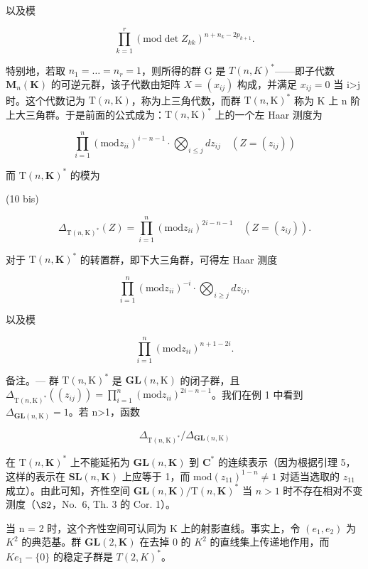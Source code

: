 以及模

\[
\prod_ {k = 1} ^ {r} (\mathrm{mod} \det Z _ {k k}) ^ {n + n _ {k} - 2 p _ {k + 1}}.
\]

特别地，若取 \(n_{1}=\ldots=n_{r}=1\)，则所得的群 G 是 \(T(n,K)^{*}\)——即子代数 \(\mathbf{M}_{n}(\mathbf{K})\) 的可逆元群，该子代数由矩阵 \(X=(x_{ij})\) 构成，并满足 \(x_{ij}=0\) 当 i\textgreater j 时。这个代数记为 \(\mathrm{T}(n,\mathrm{K})\)，称为上三角代数，而群 \(\mathrm{T}(n,\mathrm{K})^{*}\) 称为 K 上 n 阶上大三角群。于是前面的公式成为：\(\mathrm{T}(n,\mathrm{K})^{*}\) 上的一个左 Haar 测度为

\[
\prod_ {i = 1} ^ {n} (\mathrm{mod} z _ {i i}) ^ {i - n - 1} \cdot \bigotimes_ {i \leqslant j} d z _ {i j} \quad (Z = (z _ {i j}))\tag{9 bis}
\]

而 \(\mathrm{T}(n,\mathbf{K})^*\) 的模为

(10 bis)

\[
\Delta_ {\mathrm{T} (n, \mathrm{K}) ^ {*}} (Z) = \prod_ {i = 1} ^ {n} (\mathrm{mod} z _ {i i}) ^ {2 i - n - 1} \quad \left(Z = \left(z _ {i j}\right)\right).
\]

对于 \(\mathrm{T}(n,\mathbf{K})^*\) 的转置群，即下大三角群，可得左 Haar 测度

\[
\prod_ {i = 1} ^ {n} (\mathrm{mod} z _ {i i}) ^ {- i} \cdot \bigotimes_ {i \geqslant j} d z _ {i j},
\]

以及模

\[
\prod_ {i = 1} ^ {n} (\mathrm{mod} z _ {i i}) ^ {n + 1 - 2 i}.
\]

备注。--- 群 \(\mathrm{T}(n,\mathrm{K})^{*}\) 是 \(\mathbf{GL}(n,\mathrm{K})\) 的闭子群，且 \(\Delta_{\mathrm{T}(n,\mathrm{K})^{*}}\left((z_{ij})\right)=\prod_{i=1}^{n}(\mathrm{mod}z_{ii})^{2i-n-1}\)。我们在例 1 中看到 \(\Delta_{\mathbf{GL}(n,\mathrm{K})}=1\)。若 n\textgreater1，函数

\[
\Delta_ {\mathrm{T} (n, \mathrm{K}) ^ {*}} / \Delta_ {\mathbf {G L} (n, \mathrm{K})}
\]

在 \(\mathrm{T}(n,\mathbf{K})^*\) 上不能延拓为 \(\mathbf{GL}(n,\mathbf{K})\) 到 \(\mathbf{C}^*\) 的连续表示（因为根据引理 5，这样的表示在 \(\mathbf{SL}(n,\mathbf{K})\) 上应等于 1，而 \(\mathrm{mod}(z_{11})^{1 - n}\neq 1\) 对适当选取的 \(z_{11}\) 成立）。由此可知，齐性空间 \(\mathbf{GL}(n,\mathbf{K}) / \mathrm{T}(n,\mathbf{K})^*\) 当 \(n > 1\) 时不存在相对不变测度（\(\S 2\)，No.~6, Th. 3 的 Cor. 1）。

当 n = 2 时，这个齐性空间可认同为 K 上的射影直线。事实上，令 \((e_{1}, e_{2})\) 为 \(K^{2}\) 的典范基。群 \(\mathbf{GL}(2, \mathbf{K})\) 在去掉 0 的 \(K^{2}\) 的直线集上传递地作用，而 \(Ke_{1} - \{0\}\) 的稳定子群是 \(T(2, K)^{*}\)。

